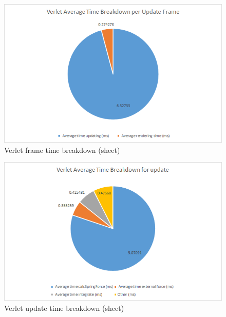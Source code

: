     \begin{figure}
    \begin{center}
      \includegraphics[scale=.9]{Figures/sheet_v_ft}
    \end{center}
    \caption{Verlet frame time breakdown (sheet)}
    \label{fig:v ft sheet}
  \end{figure}
  
    \begin{figure}
    \begin{center}
      \includegraphics[scale=.9]{Figures/sheet_v_ut}
    \end{center}
    \caption{Verlet update time breakdown (sheet)}
    \label{fig:v ut sheet}
  \end{figure}

